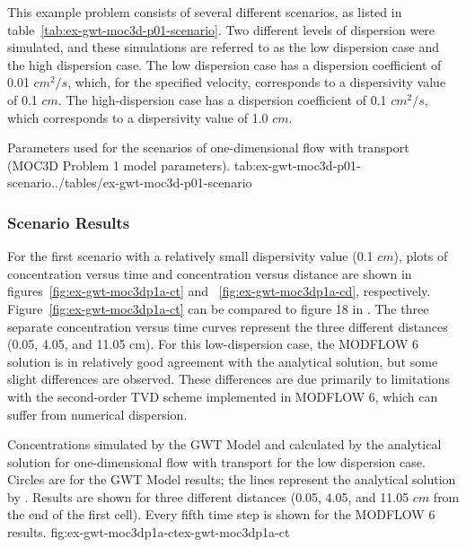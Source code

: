 This example problem consists of several different scenarios, as listed in table~\ref{tab:ex-gwt-moc3d-p01-scenario}.  Two different levels of dispersion were simulated, and these simulations are referred to as the low dispersion case and the high dispersion case.  The low dispersion case has a dispersion coefficient of 0.01 $cm^2/s$, which, for the specified velocity, corresponds to a dispersivity value of 0.1 $cm$.  The high-dispersion case has a dispersion coefficient of 0.1 $cm^2/s$, which corresponds to a dispersivity value of 1.0 $cm$.

\begin{ScenarioTable}{
                                   Parameters used for the scenarios of one-dimensional flow with transport (MOC3D Problem 1 model parameters).
                                   }{tab:ex-gwt-moc3d-p01-scenario}{../tables/ex-gwt-moc3d-p01-scenario}
\end{ScenarioTable}

\subsubsection{Scenario Results}

For the first scenario with a relatively small dispersivity value (0.1 $cm$), plots of concentration versus time and concentration versus distance are shown in figures~\ref{fig:ex-gwt-moc3dp1a-ct} and ~\ref{fig:ex-gwt-moc3dp1a-cd}, respectively.  Figure~\ref{fig:ex-gwt-moc3dp1a-ct} can be compared to figure 18 in \cite{konikow1996three}. The three separate concentration versus time curves represent the three different distances (0.05, 4.05, and 11.05 cm).  For this low-dispersion case, the MODFLOW 6 solution is in relatively good agreement with the analytical solution, but some slight differences are observed.  These differences are due primarily to limitations with the second-order TVD scheme implemented in MODFLOW 6, which can suffer from numerical dispersion.

\begin{StandardFigure}{
                                     Concentrations simulated by the \mf GWT Model and calculated by the analytical solution for one-dimensional flow with transport for the low dispersion case.  Circles are for the GWT Model results; the lines represent the analytical solution by \cite{wexler1992}.  Results are shown for three different distances (0.05, 4.05, and 11.05 $cm$ from the end of the first cell).  Every fifth time step is shown for the MODFLOW 6 results.
                                     }{fig:ex-gwt-moc3dp1a-ct}{ex-gwt-moc3dp1a-ct}
\end{StandardFigure}            

